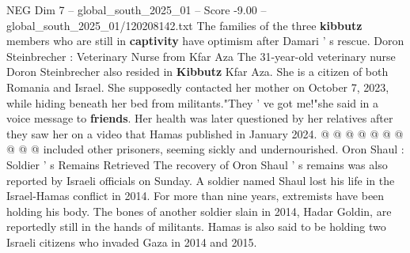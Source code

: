 \begin{textsample}{NEG Dim 7 – global\_south\_2025\_01 – Score -9.00 – global\_south\_2025\_01/120208142.txt}
The families of the three \textbf{kibbutz} members who are still in \textbf{captivity} have optimism after Damari ' s rescue.
Doron Steinbrecher : Veterinary Nurse from Kfar Aza The 31-year-old veterinary nurse Doron Steinbrecher also resided in \textbf{Kibbutz} Kfar Aza.
She is a citizen of both Romania and Israel.
She supposedly contacted her mother on October 7, 2023, while hiding beneath her bed from militants."They ' ve got me!"she said in a voice message to \textbf{friends}.
Her health was later questioned by her relatives after they saw her on a video that Hamas published in January 2024. @ @ @ @ @ @ @ @ @ @ included other prisoners, seeming sickly and undernourished.
Oron Shaul : Soldier ' s Remains Retrieved The recovery of Oron Shaul ' s remains was also reported by Israeli officials on Sunday.
A soldier named Shaul lost his life in the Israel-Hamas conflict in 2014.
For more than nine years, extremists have been holding his body.
The bones of another soldier slain in 2014, Hadar Goldin, are reportedly still in the hands of militants.
Hamas is also said to be holding two Israeli citizens who invaded Gaza in 2014 and 2015.

\end{textsample}
